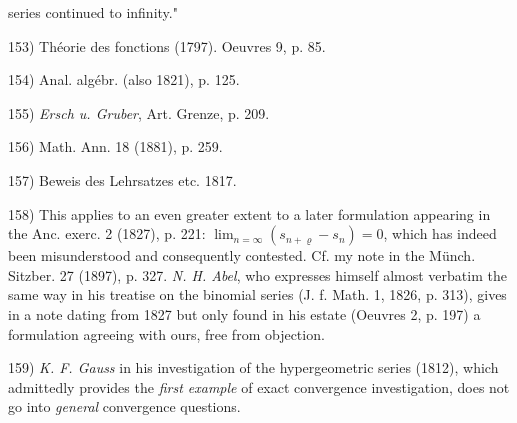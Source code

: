 \vfill
\leftline{\rule{2in}{0.4pt}}
\vspace{0.2cm}
{
\footnotesize

series continued to infinity."

153) Théorie des fonctions (1797). Oeuvres 9, p. 85.

154) Anal. algébr. (also 1821), p. 125.

155) \textit{Ersch u. Gruber}, Art. Grenze, p. 209.

156) Math. Ann. 18 (1881), p. 259.

157) Beweis des Lehrsatzes etc. 1817.

158) This applies to an even greater extent to a later formulation appearing in the Anc. exerc. 2 (1827), p. 221: $\lim_{n=\infty} (s_{n+\varrho} - s_n) = 0$, which has indeed been misunderstood and consequently contested. Cf. my note in the Münch. Sitzber. 27 (1897), p. 327. \textit{N. H. Abel}, who expresses himself almost verbatim the same way in his treatise on the binomial series (J. f. Math. 1, 1826, p. 313), gives in a note dating from 1827 but only found in his estate (Oeuvres 2, p. 197) a formulation agreeing with ours, free from objection.

159) \textit{K. F. Gauss} in his investigation of the hypergeometric series (1812), which admittedly provides the \textit{first example} of exact convergence investigation, does not go into \textit{general} convergence questions.

}